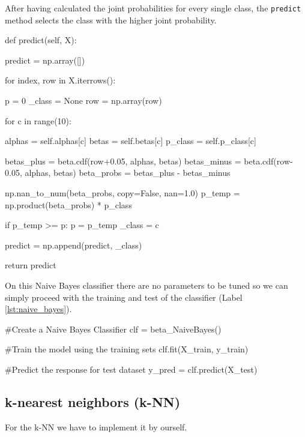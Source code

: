 \documentclass[12pt]{article}
\begin{document}
After having calculated the joint probabilities for every single class, the 
\verb|predict| method selects the class with the higher joint probability.

\pagebreak
\begin{python}[caption={Naive Bayes fit method},label={lst:predict_naive}]
def predict(self, X):

    predict = np.array([])

    for index, row in X.iterrows():

        p = 0
        _class = None
        row = np.array(row)

        for c in range(10):

            alphas = self.alphas[c]
            betas = self.betas[c]
            p_class = self.p_class[c]
            
            betas_plus = beta.cdf(row+0.05, alphas, betas)
            betas_minus = beta.cdf(row-0.05, alphas, betas)
            beta_probs = betas_plus - betas_minus
            
            np.nan_to_num(beta_probs, copy=False, nan=1.0)
            p_temp = np.product(beta_probs) * p_class
            

            if p_temp >= p:
                p = p_temp
                _class = c
        
        predict = np.append(predict, _class)
    
    return predict
\end{python}

On this Naive Bayes classifier there are no parameters to be tuned so we can simply
proceed with the training and test of the classifier (Label \ref{lst:naive_bayes}).
\pagebreak
\begin{python}[caption={Naive Bayes classifier},label={lst:naive_bayes}]
    #Create a Naive Bayes Classifier
    clf = beta_NaiveBayes() 

    #Train the model using the training sets
    clf.fit(X_train, y_train)
    
    #Predict the response for test dataset
    y_pred = clf.predict(X_test)
\end{python}

\subsection{k-nearest neighbors (k-NN)}

For the k-NN we have to implement it by ourself. 
\end{document}
